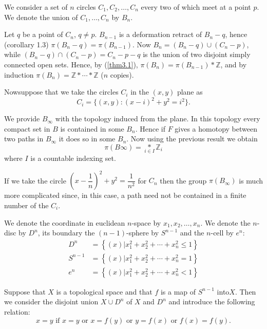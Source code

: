 \medskip
{}  We consider
a set of $n$ circles $C_1, C_2, \ldots, C_n$ every two of which
meet at a point $p$. We denote the union of $C_1, \ldots, C_n$ by
$B_n$.  
  
   Let $q$ be a point of $C_n$, $q \neq p$.  $B_{n-1}$ is a
  deformation retract of $B_n -q$, hence (corollary 1.3) $\pi
  (B_{n}-q) = \pi(B_{n-1})$. Now $B_n = (B_n -q) \cup (C_n-p)$,
  while $(B_n -q) \cap (C_n -p) = C_n -p-q$ is the union of two
  disjoint simply connected open sets. Hence, by (\ref{thm3.1}), $\pi (B_n)
  = \pi(B_{n-1}) \ast \mathbb{Z}$, and by induction $\pi (B_n) =
  \mathbb{Z} \ast\cdots \ast  \mathbb{Z}$ ($n$ copies). 
  
  Now\pageoriginale suppose that we take the circles $C_i$ in the
  $(x,y)$ plane as  
  $$
  C_i = \{(x,y) : (x-i)^2 + y^2 = i^2 \}.
  $$
  
  \noindent
  We provide $B_\infty$ with the topology induced from the plane. In
  this topology every compact set in $B$ is contained in some
  $B_n$. Hence if $F$ gives a homotopy between two paths in $B_\infty$
  it does so in some $B_n$. Now using the previous result we obtain 
  $$
  \pi  (B \infty) = \underset{i\in I}{\ast} \mathbb{Z}_i
  $$
  where  $I$ is a countable indexing set.
   
  If we take the circle $( x- \dfrac{1}{n})^2 + y^2 =  \dfrac{1}{n^2}$
  for $C_n$ then the group $\pi(B_\infty)$ is much more complicated
  since, in this case, a path need not be contained in a finite number
  of the $C_i$. 

\medskip
{}
  
 We denote the coordinate in euclidean $n$-space by $x_1, x_2,
 \ldots, x_n$. We denote the $n$-disc by $D^n$, its boundary the
 $(n-1)$-sphere by $S^{n-1}$ and the $n$-cell by $e^n$: 
\begin{align*}
D^n  & =  \left\{ (x) | x^2_1 + x^2_2 + \cdots +  x^2_n \le 1 \right\} \\
S^{n-1} & = \left\{ (x) |  x^2_1 + x^2_2 +  \cdots + x^2_n = 1 \right\} \\
e^n &= \left\{ (x) | x^2_1 + x^2_2 + \cdots +  x^2_n < 1 \right\} 
\end{align*}   
   
      Suppose that $X$ is a topological space and that $f$ is a map of
      $S^{n-1}$ into\pageoriginale $X$. Then we consider the disjoint
      union $X \cup D^n$ of $X$ and $D^n$ and introduce the
      following relation:  
   $$
   x = y \text{ if } x=y  \text{ or } x= f(y) \text{ or } y = f(x)
   \text{ or } f(x) = f(y). 
   $$
   

